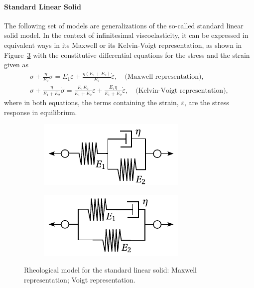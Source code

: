 \paragraph{Standard Linear Solid}
The following set of models are generalizations of the so-called standard linear solid model.
In the context of infinitesimal viscoelasticity, it can be expressed in equivalent ways in its Maxwell or its Kelvin-Voigt representation, as shown in Figure~\ref{fig:rheo_model_sls} with the constitutive differential equations for the stress and the strain given as
\begin{gather}
	\sigma+\frac{\eta}{E_2} \dot{\sigma}=E_1 \varepsilon+\frac{\eta\left(E_1+E_2\right)}{E_2} \dot{\varepsilon},\quad\text{(Maxwell representation)},
	\label{eq:sls_maxwell_rep}\\
	\sigma+\frac{\eta}{E_1+E_2} \dot{\sigma}=\frac{E_1 E_2}{E_1+E_2} \varepsilon+\frac{E_1 \eta}{E_1+E_2} \dot{\varepsilon},\quad\text{(Kelvin-Voigt representation)},
	\label{eq:sls_voigt_rep}
\end{gather}
where in both equations, the terms containing the strain, $\varepsilon$, are the stress response in equilibrium.
\begin{figure}[hbtp]
\centering
\begin{subfigure}[b]{0.45\textwidth}
\centering
\includegraphics[width=\textwidth]{figures/rheo_model_sls_maxwell}
\caption{}
\label{subfig:rheo_model_sls_maxwell}
\end{subfigure} \hfill
	\begin{subfigure}[b]{0.45\textwidth}
		\centering
						\includegraphics[width=\textwidth]{figures/rheo_model_sls_voigt}
						\caption{}
						\label{subfig:rheo_model_sls_voigt}
		\end{subfigure}
	\caption{Rheological model for the standard linear solid:  Maxwell representation;  Voigt representation.}
\label{fig:rheo_model_sls}
\end{figure}

